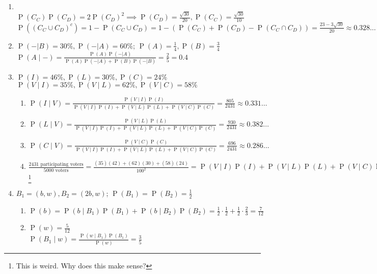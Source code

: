 \documentclass{article}
\newcommand{\pr}[1]{\operatorname{P} (#1)}
\begin{document}
\begin{enumerate}
  \item {}\\
  $\pr{C_C}\pr{C_D} = 2\pr{C_D}^2 \implies \pr{C_D} = \frac{\sqrt{30}}{20}, \pr{C_C} = \frac{\sqrt{30}}{10}$\\
  $\pr{(C_C \cup C_D)^c} = 1 - \pr{C_C \cup C_D} = 1 - (\pr{C_C} + \pr{C_D} - \pr{C_C \cap C_D}) = \frac{23-3\sqrt{30}}{20} \approx 0.328\ldots$

  \item $\pr{- | B} = 30\%, \pr{- | A} = 60\%$; $\pr{A} = \frac{1}{4}, \pr{B} = \frac{3}{4}$\\
  $\pr{A \mid -} =
  \frac{\pr{A}\pr{-|A}}{\pr{A}\pr{-|A} + \pr{B}\pr{-|B}} 
  = \frac{2}{5} = 0.4
  $

  \item $\pr{I} = 46\%, \pr{L} = 30\%, \pr{C} = 24\%$\\
  $\pr{V \mid I} = 35\%, \pr{V \mid L} = 62\%, \pr{V \mid C} = 58\%$
  \begin{enumerate}
    \item $\pr{I \mid V} = 
    \frac{\pr{V \mid I}\pr{I}}
    {\pr{V \mid I}\pr{I} + \pr{V \mid L}\pr{L} + \pr{V \mid C}\pr{C}} = \frac{805}{2431} \approx 0.331\ldots$
    
    \item $\pr{L \mid V} = 
    \frac{\pr{V \mid L}\pr{L}}
    {\pr{V \mid I}\pr{I} + \pr{V \mid L}\pr{L} + \pr{V \mid C}\pr{C}} = \frac{930}{2431} \approx 0.382\ldots$
    
    \item $\pr{C \mid V} = 
    \frac{\pr{V \mid C}\pr{C}}
    {\pr{V \mid I}\pr{I} + \pr{V \mid L}\pr{L} + \pr{V \mid C}\pr{C}} = \frac{696}{2431} \approx 0.286\ldots$
    \item $\frac{2431\text{ participating voters}}{5000\text{ voters}} 
    = \frac{(35)(42) + (62)(30) + (58)(24)}{100^2} 
    = \pr{V \mid I}\pr{I} + \pr{V \mid L}\pr{L} + \pr{V \mid C}\pr{C}$\footnote{This is weird. Why does this make sense?}
  \end{enumerate}
  
  \item $B_1 = (b,w), B_2 = (2b,w)$; $\pr{B_1} = \pr{B_2} = \frac{1}{2}$
  \begin{enumerate}
    \item $\pr{b} = \pr{b \mid B_1}\pr{B_1} + \pr{b \mid B_2}\pr{B_2} = \frac{1}{2}\cdot \frac{1}{2} + \frac{1}{2}\cdot \frac{2}{3} = \frac{7}{12}$
    \item $\pr{w} = \frac{5}{12}$\\
    $\pr{B_1 \mid w} = \frac{\pr{w \mid B_1}\pr{B_1}}{\pr{w}} = \frac{3}{5}$
  \end{enumerate}


\end{enumerate}
\end{document}
